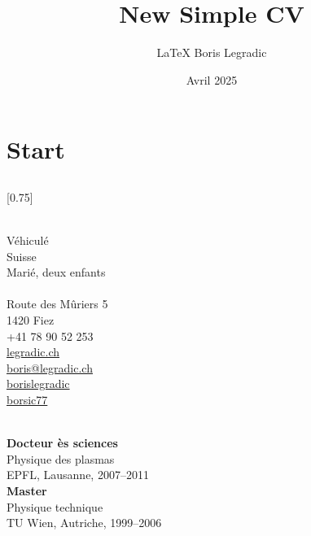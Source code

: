 \documentclass[verylight]{simplehipstercv}
\title{New Simple CV}
\author{\LaTeX{} Boris Legradic}
\date{Avril 2025}
\begin{document}
\thispagestyle{empty}

\section*{Start}


\subsection*{}
\vspace{4em}

\setlength{\columnsep}{1.5cm}
[0.75]
\begin{paracol}{2}
\paracolbackgroundoptions

\footnotesize
{\setasidefontcolour
\flushright

\bigskip \bigskip
\begin{center}
\end{center}
\bigskip \bigskip

\\[0.5em]
Véhiculé\\
Suisse\\
Marié, deux enfants\\

\bigskip \bigskip
{}\\[0.5em]
Route des Mûriers 5\\
1420 Fiez\\
+41 78 90 52 253\\

\bigskip
\href{https://legradic.ch}{legradic.ch }\\
\href{mailto:boris@legradic.ch}{boris@legradic.ch }\\
\href{https://www.linkedin.com/in/borislegradic}{borislegradic }\\
\href{https://github.com/borsic77}{borsic77 }

\bigskip \bigskip
{}\\[0.5em]
\textbf{Docteur ès sciences}\\
Physique des plasmas\\
EPFL, Lausanne, 2007–2011\\[0.5em]

\textbf{Master}\\
Physique technique\\
TU Wien, Autriche, 1999–2006

}
\end{paracol}
\end{document}
